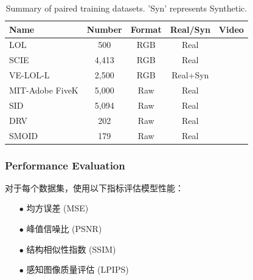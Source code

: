 \documentclass[a4paper]{ctexart}
\begin{document}
	\begin{table}[!htbp]
		\centering
		\tiny
			\begin{tabular}{>{\centering\arraybackslash}m{2.5cm}|c|c|c|c}
				
				\hline
				
				\textbf{Name} & \textbf{Number} & \textbf{Format} & \textbf{Real/Syn} & \textbf{Video} \\
				
				\hline
				
				LOL\cite{wei2018deep} & 500 & RGB & Real & \\
				
				SCIE\cite{cai2018learning} & 4,413 & RGB & Real & \\
				
				VE-LOL-L\cite{jiang2019learning} & 2,500 & RGB & Real+Syn & \\
				
				MIT-Adobe FiveK\cite{bychkovsky2011learning} & 5,000 & Raw & Real & \\
				
				SID\cite{wei2018deep} & 5,094 & Raw & Real & \\
				
				DRV\cite{chen2019seeing} & 202 & Raw & Real & \checkmark  \\
				
				SMOID\cite{jiang2019learning} & 179 & Raw & Real & \checkmark  \\
				
				\hline
				
			\end{tabular}
		\captionsetup{font=scriptsize} %
		\caption{\label{tab: Paired_training_datases}
			Summary of paired training datasets. 'Syn' represents Synthetic.} %
		
	\end{table}
	
	\subsubsection{Performance Evaluation}
	
	对于每个数据集，使用以下指标评估模型性能：
	
	\begin{itemize}
		\item[$\bullet$]
		均方误差 (MSE)
		\item[$\bullet$]
		峰值信噪比 (PSNR)
		\item[$\bullet$]
		结构相似性指数 (SSIM)
		\item[$\bullet$]
		感知图像质量评估 (LPIPS)
	\end{itemize}
	
\end{document}
